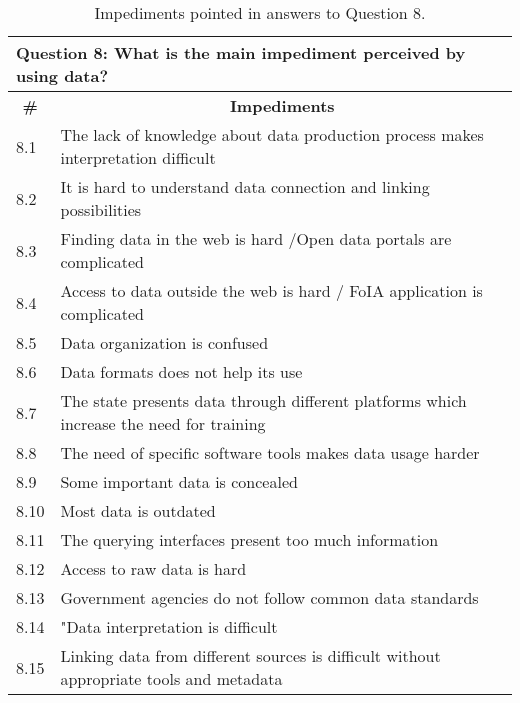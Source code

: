 \begin{table}[]
\ABNTEXfontereduzida
\caption{Impediments pointed in answers to Question 8.}
\label{tab:dl_results2}
\begin{tabular}{|l|l|}
\hline
\multicolumn{2}{|l|}{Question 8: What is the main impediment perceived by using data?}                                       \\ \hline
\multicolumn{1}{|c|}{\textbf{\#}} & \multicolumn{1}{c|}{\textbf{Impediments}}                                                \\ \hline
8.1                               & The lack of knowledge about data production process makes interpretation difficult       \\ \hline
8.2                               & It is hard to understand data connection and linking possibilities                       \\ \hline
8.3                               & Finding data in the web is hard /Open data portals are complicated                       \\ \hline
8.4                               & Access to data outside the web is hard / FoIA application is complicated                 \\ \hline
8.5                               & Data organization is confused                                                            \\ \hline
8.6                               & Data formats does not help its use                                                       \\ \hline
8.7                               & The state presents data through different platforms which increase the need for training \\ \hline
8.8                               & The need of specific software tools makes data usage harder                              \\ \hline
8.9                               & Some important data is concealed                                                         \\ \hline
8.10                              & Most data is outdated                                                                    \\ \hline
8.11                              & The querying interfaces present too much information                                     \\ \hline
8.12                              & Access to raw data is hard                                                               \\ \hline
8.13                              & Government agencies do not follow common data standards                                  \\ \hline
8.14                              & "Data interpretation is difficult                                                        \\ \hline
8.15                              & Linking data from different sources is difficult without appropriate tools and metadata  \\ \hline
\end{tabular}
\end{table}


